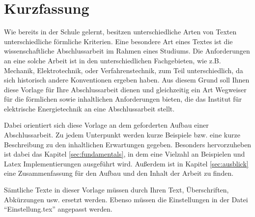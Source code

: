 
\chapter*{Kurzfassung}   \label{cha:Kurzfassung}

Wie bereits in der Schule gelernt, besitzen unterschiedliche Arten von Texten unterschiedliche förmliche Kriterien. Eine besondere Art eines Textes ist die wissenschaftliche Abschlussarbeit im Rahmen eines Studiums. Die Anforderungen an eine solche Arbeit ist in den unterschiedlichen Fachgebieten, wie z.B. Mechanik, Elektrotechnik, oder Verfahrenstechnik, zum Teil unterschiedlich, da sich historisch andere Konventionen ergeben haben. Aus diesem Grund soll Ihnen diese Vorlage für Ihre Abschlussarbeit dienen und gleichzeitig ein Art Wegweiser für die förmlichen sowie inhaltlichen Anforderungen bieten, die das Institut für elektrische Energietechnik an eine Abschlussarbeit stellt.

Dabei orientiert sich diese Vorlage an dem geforderten Aufbau einer Abschlussarbeit. Zu jedem Unterpunkt werden kurze Beispiele bzw. eine kurze Beschreibung zu den inhaltlichen Erwartungen gegeben. Besonders hervorzuheben ist dabei das Kapitel \ref{sec:fundamentals}, in dem eine Vielzahl an Beispielen und Latex Implementierungen ausgeführt wird. Außerdem ist in Kapitel \ref{sec:ausblick} eine Zusammenfassung für den Aufbau und den Inhalt der Arbeit zu finden. 

Sämtliche Texte in dieser Vorlage müssen durch Ihren Text, Überschriften, Abkürzungen usw. ersetzt werden. Ebenso müssen die Einstellungen in der Datei \enquote{Einstellung.tex} angepasst werden. 

